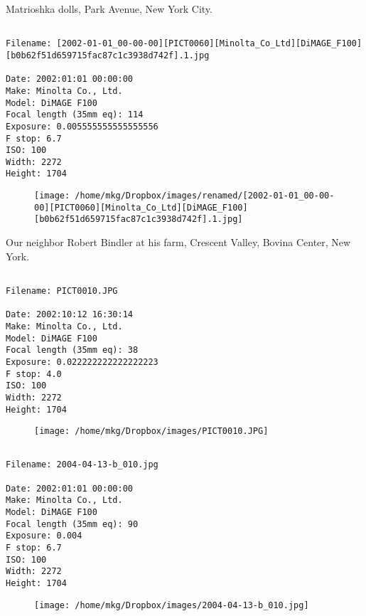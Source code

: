 \clearpage
\onecolumn
\noindent Matrioshka dolls, Park Avenue, New York City.
\noindent
\begin{lstlisting}

Filename: [2002-01-01_00-00-00][PICT0060][Minolta_Co_Ltd][DiMAGE_F100][b0b62f51d659715fac87c1c3938d742f].1.jpg

Date: 2002:01:01 00:00:00
Make: Minolta Co., Ltd.
Model: DiMAGE F100
Focal length (35mm eq): 114
Exposure: 0.005555555555555556
F stop: 6.7
ISO: 100
Width: 2272
Height: 1704
\end{lstlisting}
\clearpage

\begin{figure}
\texttt{[image: /home/mkg/Dropbox/images/renamed/[2002-01-01\_00-00-00][PICT0060][Minolta\_Co\_Ltd][DiMAGE\_F100][b0b62f51d659715fac87c1c3938d742f].1.jpg]}
\end{figure}
    
\clearpage
\onecolumn
\noindent Our neighbor Robert Bindler at his farm, Crescent Valley, Bovina Center, New York.
\noindent
\begin{lstlisting}

Filename: PICT0010.JPG

Date: 2002:10:12 16:30:14
Make: Minolta Co., Ltd.
Model: DiMAGE F100
Focal length (35mm eq): 38
Exposure: 0.022222222222222223
F stop: 4.0
ISO: 100
Width: 2272
Height: 1704
\end{lstlisting}
\clearpage

\begin{figure}
\texttt{[image: /home/mkg/Dropbox/images/PICT0010.JPG]}
\end{figure}
    
\clearpage
\onecolumn
\noindent 
\noindent
\begin{lstlisting}

Filename: 2004-04-13-b_010.jpg

Date: 2002:01:01 00:00:00
Make: Minolta Co., Ltd.
Model: DiMAGE F100
Focal length (35mm eq): 90
Exposure: 0.004
F stop: 6.7
ISO: 100
Width: 2272
Height: 1704
\end{lstlisting}
\clearpage

\begin{figure}
\texttt{[image: /home/mkg/Dropbox/images/2004-04-13-b\_010.jpg]}
\end{figure}
    
